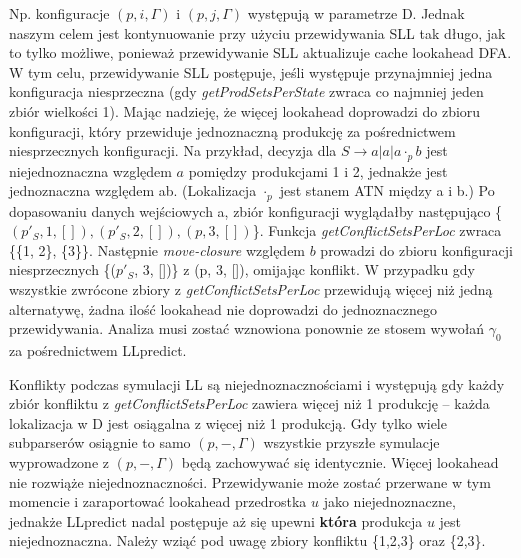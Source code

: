 Np. konfiguracje $(p, i, \Gamma)$ i $(p, j, \Gamma)$ występują w parametrze D.
Jednak naszym celem jest kontynuowanie przy użyciu przewidywania SLL tak długo,
jak to tylko możliwe, ponieważ przewidywanie SLL aktualizuje cache lookahead DFA.
W tym celu, przewidywanie SLL postępuje, jeśli występuje przynajmniej jedna konfiguracja
niesprzeczna (gdy \textit{getProdSetsPerState} zwraca co najmniej jeden zbiór wielkości 1).
Mając nadzieję, że więcej lookahead doprowadzi do zbioru konfiguracji,
który przewiduje jednoznaczną produkcję za pośrednictwem niesprzecznych konfiguracji.
Na przykład, decyzja dla $S \rightarrow a|a|a \cdot_p b$ jest niejednoznaczna względem $a$
pomiędzy produkcjami 1 i 2, jednakże jest jednoznaczna względem ab.
(Lokalizacja $\cdot_p$ jest stanem ATN między a i b.)
Po dopasowaniu danych wejściowych a,
zbiór konfiguracji wyglądałby następująco \{$(p'_S, 1, []), (p'_S, 2, []), (p, 3, [])$\}.
Funkcja \textit{getConflictSetsPerLoc} zwraca \{\{1, 2\}, \{3\}\}.
Następnie \textit{move-closure} względem $b$ prowadzi do zbioru konfiguracji
niesprzecznych \{($p'_S$, 3, [])\} z (p, 3, []), omijając konflikt.
W przypadku gdy wszystkie zwrócone zbiory z \textit{getConflictSetsPerLoc} przewidują więcej
niż jedną alternatywę, żadna ilość lookahead nie doprowadzi do jednoznacznego przewidywania.
Analiza musi zostać wznowiona ponownie ze stosem wywołań $\gamma_0$ za pośrednictwem LLpredict.
\\
\par
Konflikty podczas symulacji LL są niejednoznacznościami i występują gdy każdy
zbiór konfliktu z \textit{getConflictSetsPerLoc} zawiera więcej niż 1 produkcję – każda lokalizacja
w D jest osiągalna z więcej niż 1 produkcją.
Gdy tylko wiele subparserów osiągnie to samo $(p, -, \Gamma)$ wszystkie przyszłe
symulacje wyprowadzone z $(p, -, \Gamma)$ będą zachowywać się identycznie.
Więcej lookahead nie rozwiąże niejednoznaczności.
Przewidywanie może zostać przerwane w tym momencie i zaraportować lookahead przedrostka
$u$ jako niejednoznaczne, jednakże LLpredict nadal postępuje aż się upewni
\textbf{która} produkcja $u$ jest niejednoznaczna.
Należy wziąć pod uwagę zbiory konfliktu \{1,2,3\} oraz \{2,3\}.
